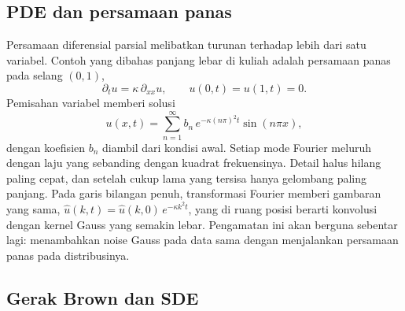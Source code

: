 \subsection{PDE dan persamaan panas}

Persamaan diferensial parsial melibatkan turunan terhadap lebih dari satu variabel. Contoh yang
dibahas panjang lebar di kuliah adalah persamaan panas pada selang $(0,1)$,
\begin{equation}
\partial_tu=\kappa\,\partial_{xx}u,\qquad u(0,t)=u(1,t)=0.
\end{equation}
Pemisahan variabel memberi solusi
\begin{equation}
u(x,t)=\sum_{n=1}^\infty b_n\,e^{-\kappa(n\pi)^2t}\sin(n\pi x),
\end{equation}
dengan koefisien $b_n$ diambil dari kondisi awal. Setiap mode Fourier meluruh dengan laju yang
sebanding dengan kuadrat frekuensinya. Detail halus hilang paling cepat, dan setelah cukup lama
yang tersisa hanya gelombang paling panjang. Pada garis bilangan penuh, transformasi Fourier
memberi gambaran yang sama, $\hat u(k,t)=\hat u(k,0)\,e^{-\kappa k^2t}$, yang di ruang posisi berarti
konvolusi dengan kernel Gauss yang semakin lebar. Pengamatan ini akan berguna sebentar
lagi: menambahkan noise Gauss pada data sama dengan menjalankan persamaan panas pada distribusinya.

\subsection{Gerak Brown dan SDE}

